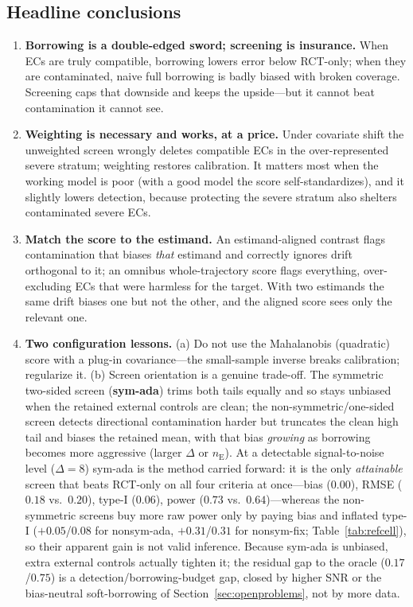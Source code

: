 \documentclass[11pt]{article}
\newcommand{\E}{\mathrm{E}}
\begin{document}
\subsection{Headline conclusions}

\begin{enumerate}
    \item \textbf{Borrowing is a double-edged sword; screening is insurance.} When ECs are truly compatible, borrowing lowers error below RCT-only; when they are contaminated, naive full borrowing is badly biased with broken coverage. Screening caps that downside and keeps the upside---but it cannot beat contamination it cannot see.
    \item \textbf{Weighting is necessary and works, at a price.} Under covariate shift the unweighted screen wrongly deletes compatible ECs in the over-represented severe stratum; weighting restores calibration. It matters most when the working model is poor (with a good model the score self-standardizes), and it slightly lowers detection, because protecting the severe stratum also shelters contaminated severe ECs.
    \item \textbf{Match the score to the estimand.} An estimand-aligned contrast flags contamination that biases \emph{that} estimand and correctly ignores drift orthogonal to it; an omnibus whole-trajectory score flags everything, over-excluding ECs that were harmless for the target. With two estimands the same drift biases one but not the other, and the aligned score sees only the relevant one.
    \item \textbf{Two configuration lessons.} (a) Do not use the Mahalanobis (quadratic) score with a plug-in covariance---the small-sample inverse breaks calibration; regularize it. (b) Screen orientation is a genuine trade-off. The symmetric two-sided screen (\textbf{sym-ada}) trims both tails equally and so stays unbiased when the retained external controls are clean; the non-symmetric/one-sided screen detects directional contamination harder but truncates the clean high tail and biases the retained mean, with that bias \emph{growing} as borrowing becomes more aggressive (larger $\Delta$ or $n_{\E}$). At a detectable signal-to-noise level ($\Delta{=}8$) sym-ada is the method carried forward: it is the only \emph{attainable} screen that beats RCT-only on all four criteria at once---bias ($0.00$), RMSE ($0.18$ vs.\ $0.20$), type-I ($0.06$), power ($0.73$ vs.\ $0.64$)---whereas the non-symmetric screens buy more raw power only by paying bias and inflated type-I ($+0.05$/$0.08$ for nonsym-ada, $+0.31$/$0.31$ for nonsym-fix; Table~\ref{tab:refcell}), so their apparent gain is not valid inference. Because sym-ada is unbiased, extra external controls actually tighten it; the residual gap to the oracle ($0.17$/$0.75$) is a detection/borrowing-budget gap, closed by higher SNR or the bias-neutral soft-borrowing of Section~\ref{sec:openproblems}, not by more data.

\end{enumerate}
\end{document}
